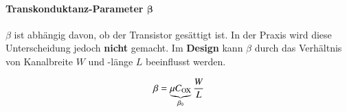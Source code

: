 


\paragraph{Transkonduktanz-Parameter $\bm{\beta}$}

\begin{minipage}[c]{0.78\columnwidth}
    $\beta$ ist abhängig davon, ob der Transistor gesättigt ist. 
    In der Praxis wird diese Unterscheidung jedoch \textbf{nicht} gemacht. 
    Im \textbf{Design} kann $\beta$ durch das Verhältnis von Kanalbreite $W$ und -länge $L$ beeinflusst werden.
\end{minipage}
\hfill
\begin{minipage}[c]{0.2\columnwidth}
    $$ \beta = \underbrace{ \mu C_{\rm OX} }_{\beta_0} \frac{W}{L} $$
\end{minipage}





